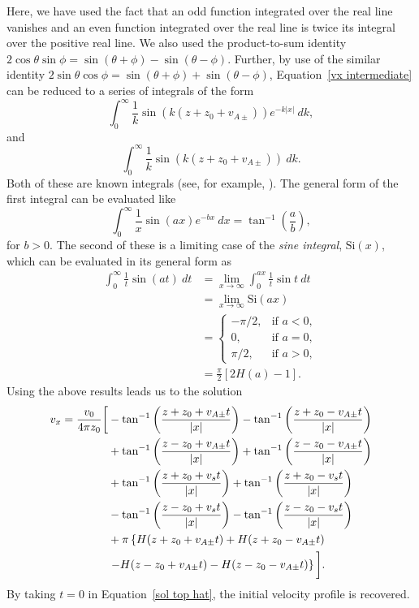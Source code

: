 \documentclass[12pt]{../style-files/ociamthesis}
\begin{document}
Here, we have used the fact that an odd function integrated over the real line vanishes and an even function integrated over the real line is twice its integral over the positive real line. We also used the product-to-sum identity $2\cos{\theta}\sin{\phi} = \sin(\theta + \phi) - \sin(\theta - \phi)$. Further, by use of the similar identity $2\sin{\theta}\cos{\phi} = \sin(\theta + \phi) + \sin(\theta - \phi)$, Equation~\eqref{vx intermediate} can be reduced to a series of integrals of the form
\begin{equation}
\int_{0}^{\infty} \frac{1}{k}\sin(k(z + z_0 + v_{A\pm}))e^{-k|x|} ~dk,
\end{equation}
and
\begin{equation}
\int_{0}^{\infty} \frac{1}{k}\sin(k(z + z_0 + v_{A\pm})) ~dk.
\end{equation}
Both of these are known integrals (see, for example, \citealp{abr_etal65}). The general form of the first integral can be evaluated like
\begin{equation}
\int_{0}^{\infty} \frac{1}{x}\sin(ax) e^{-bx} ~dx = \tan^{-1}\left(\frac{a}{b}\right),
\end{equation}
for $b > 0$. The second of these is a limiting case of the \textit{sine integral}, $\mathrm{Si}(x)$, which can be evaluated in its general form as
\begin{align}
\int_{0}^{\infty} \frac{1}{t}\sin(at) ~dt &= \lim_{x \to \infty}\int_{0}^{ax} \frac{1}{t}\sin{t} ~dt \\
&= \lim_{x \to \infty} \mathrm{Si}(ax)  \\
&=
\begin{cases}
-\pi/2, &\text{if  } a < 0, \\
0, &\text{if  } a = 0, \\
\pi/2, &\text{if  } a > 0,
\end{cases} \\
&= \frac{\pi}{2} \left[2H(a) - 1\right].
\end{align}
Using the above results leads us to the solution
\begin{align}
v_x = \frac{v_0}{4\pi z_0} \bigg[ &-\tan^{-1}\left( \frac{z + z_0 + v_{A\pm}t}{|x|} \right) - \tan^{-1}\left( \frac{z + z_0 - v_{A\pm}t}{|x|} \right)  \notag \\
&+ \tan^{-1}\left( \frac{z - z_0 + v_{A\pm}t}{|x|} \right) + \tan^{-1}\left( \frac{z - z_0 - v_{A\pm}t}{|x|} \right) \notag \\
&+ \tan^{-1}\left( \frac{z + z_0 + v_st}{|x|} \right) + \tan^{-1}\left( \frac{z + z_0 - v_st}{|x|} \right) \notag \\
&- \tan^{-1}\left( \frac{z - z_0 + v_st}{|x|} \right) - \tan^{-1}\left( \frac{z - z_0 - v_st}{|x|} \right) \notag \\
&+ \pi \left\{ H(z + z_0 + v_{A\pm}t) + H(z + z_0 - v_{A\pm}t) \right.  \notag \\
&\left. - H(z - z_0 + v_{A\pm}t) - H(z - z_0 - v_{A\pm}t) \right\} \bigg]. \label{sol top hat}
\end{align}
By taking $t = 0$ in Equation~\eqref{sol top hat}, the initial velocity profile is recovered.
\end{document}
